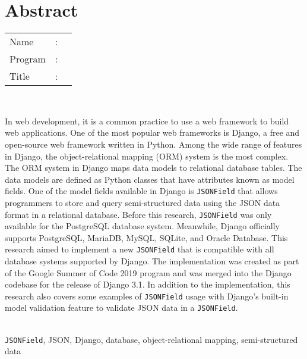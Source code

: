 %
%
%

\chapter*{Abstract}
\singlespacing

\vspace*{0.2cm}

\noindent \begin{tabular}{l l p{11.0cm}}
	Name&: & \penulis \\
	Program&: & \program \\
	Title&: & \judulInggris \\
\end{tabular} \\

\vspace*{0.5cm}

\noindent
In web development, it is a common practice to use a web framework to build web
applications. One of the most popular web frameworks is Django, a free and
open-source web framework written in Python. Among the wide range of features
in Django, the object-relational mapping (ORM) system is the most complex. The
ORM system in Django maps data models to relational database tables. The data
models are defined as Python classes that have attributes known as model
fields. One of the model fields available in Django is \verb|JSONField| that
allows programmers to store and query semi-structured data using the JSON data
format in a relational database. Before this research, \verb|JSONField| was
only available for the PostgreSQL database system. Meanwhile, Django officially
supports PostgreSQL, MariaDB, MySQL, SQLite, and Oracle Database. This research
aimed to implement a new \verb|JSONField| that is compatible with all database
systems supported by Django. The implementation was created as part of the
Google Summer of Code 2019 program and was merged into the Django codebase for
the release of Django 3.1. In addition to the implementation, this research
also covers some examples of \verb|JSONField| usage with Django's built-in
model validation feature to validate JSON data in a \verb|JSONField|.\\

\vspace*{0.2cm}

\noindent {} \\
\verb|JSONField|, JSON, Django, database, object-relational mapping,
semi-structured data \\

\onehalfspacing
\newpage
